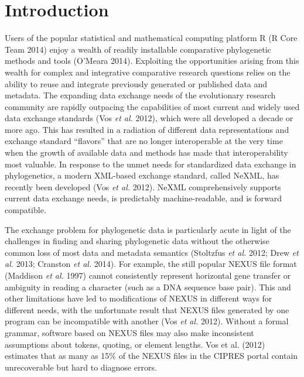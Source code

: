 \documentclass[author-year, review, 11pt]{components/elsarticle} %
\begin{document}
\section{Introduction}\label{introduction}

Users of the popular statistical and mathematical computing platform R
(R Core Team 2014) enjoy a wealth of readily installable comparative
phylogenetic methods and tools (O'Meara 2014). Exploiting the
opportunities arising from this wealth for complex and integrative
comparative research questions relies on the ability to reuse and
integrate previously generated or published data and metadata. The
expanding data exchange needs of the evolutionary research community are
rapidly outpacing the capabilities of most current and widely used data
exchange standards (Vos \emph{et al.} 2012), which were all developed a
decade or more ago. This has resulted in a radiation of different data
representations and exchange standard ``flavors'' that are no longer
interoperable at the very time when the growth of available data and
methods has made that interoperability most valuable. In response to the
unmet needs for standardized data exchange in phylogenetics, a modern
XML-based exchange standard, called NeXML, has recently been developed
(Vos \emph{et al.} 2012). NeXML comprehensively supports current data
exchange needs, is predictably machine-readable, and is forward
compatible.

The exchange problem for phylogenetic data is particularly acute in
light of the challenges in finding and sharing phylogenetic data without
the otherwise common loss of most data and metadata semantics (Stoltzfus
\emph{et al.} 2012; Drew \emph{et al.} 2013; Cranston \emph{et al.}
2014). For example, the still popular NEXUS file format (Maddison
\emph{et al.} 1997) cannot consistently represent horizontal gene
transfer or ambiguity in reading a character (such as a DNA sequence
base pair). This and other limitations have led to modifications of
NEXUS in different ways for different needs, with the unfortunate result
that NEXUS files generated by one program can be incompatible with
another (Vos \emph{et al.} 2012). Without a formal grammar, software
based on NEXUS files may also make inconsistent assumptions about
tokens, quoting, or element lengths. Vos et al. (2012) estimates that as
many as 15\% of the NEXUS files in the CIPRES portal contain
unrecoverable but hard to diagnose errors.
\end{document}
